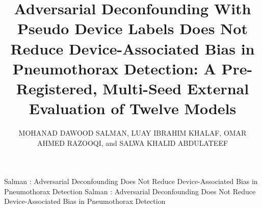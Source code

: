\documentclass{ieeeaccess}
\begin{document}

\title{Adversarial Deconfounding With Pseudo Device Labels Does Not Reduce Device-Associated Bias in Pneumothorax Detection: A Pre-Registered, Multi-Seed External Evaluation of Twelve Models}
\author{\uppercase{Mohanad Dawood Salman}, \uppercase{Luay Ibrahim Khalaf}, \uppercase{Omar Ahmed Razooqi}, and \uppercase{Salwa Khalid Abdulateef}}
\address[1]{Computer Science Department, College of Computer Science and Mathematics, Tikrit University, Tikrit, Salah al-Deen 34001, Iraq}
\address[2]{Department of Hadith and Its Sciences, College of Islamic Sciences, Tikrit University, Tikrit, Salah al-Deen 34001, Iraq}

\markboth
{Salman \headeretal: Adversarial Deconfounding Does Not Reduce Device-Associated Bias in Pneumothorax Detection}
{Salman \headeretal: Adversarial Deconfounding Does Not Reduce Device-Associated Bias in Pneumothorax Detection}

\end{document}

